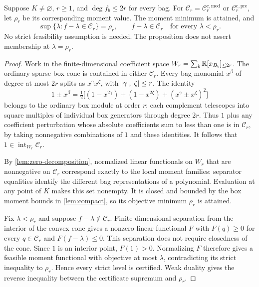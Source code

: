 \begin{proposition}\label{prop:constr-dual}
Suppose $K\ne\varnothing$, $r\ge1$, and $\deg f_b\le2r$ for every bag.
For $\mathcal C_r=\mathcal C_r^{\mathrm{c,mod}}$ or
$\mathcal C_r^{\mathrm{c,pre}}$, let $\rho_r$ be its corresponding moment
value. The moment minimum is attained, and
\[
 \sup\{\lambda:f-\lambda\in\mathcal C_r\}=\rho_r,
 \qquad f-\lambda\in\mathcal C_r\quad\text{for every }\lambda<\rho_r.
\]
No strict feasibility assumption is needed. The proposition does not assert
membership at $\lambda=\rho_r$.
\end{proposition}
\begin{proof}
Work in the finite-dimensional coefficient space
$W_r=\sum_b\mathbb{R}[x_{B_b}]_{\le 2r}$. The ordinary sparse box cone is contained
in either $\mathcal C_r$. Every bag monomial $x^\beta$ of degree at most
$2r$ splits as $x^\gamma x^\zeta$, with $\lvert \gamma\rvert,\lvert \zeta\rvert\le r$.
The identity
\[
 1\pm x^\beta=\tfrac12\bigl[(1-x^{2\gamma})+(1-x^{2\zeta})
                         +(x^\gamma\pm x^\zeta)^2\bigr]
\]
belongs to the ordinary box module at order $r$: each complement telescopes
into square multiples of individual box generators through degree $2r$.
Thus $1$ plus any coefficient perturbation whose absolute coefficients
sum to less than one is in $\mathcal C_r$, by taking nonnegative
combinations of $1$ and these identities. It follows that
$1\in\operatorname{int}_{W_r}\mathcal C_r$.

By \cref{lem:zero-decomposition}, normalized linear functionals on $W_r$
that are nonnegative on $\mathcal C_r$ correspond exactly to the local
moment families: separator equalities identify the different bag
representations of a polynomial. Evaluation at any point of $K$ makes this
set nonempty. It is closed and bounded by the box moment bounds in
\cref{lem:compact}, so its objective minimum $\rho_r$ is attained.

Fix $\lambda<\rho_r$ and suppose $f-\lambda\notin\mathcal C_r$.
Finite-dimensional separation from the interior of the convex cone gives
a nonzero linear functional $F$ with $F(q)\ge0$ for every
$q\in\mathcal C_r$ and $F(f-\lambda)\le0$. This separation does not require
closedness of the cone. Since $1$ is an interior point, $F(1)>0$.
Normalizing $F$ therefore gives a feasible moment functional with objective
at most $\lambda$, contradicting its strict inequality to $\rho_r$.
Hence every strict level is certified. Weak duality gives the reverse
inequality between the certificate supremum and $\rho_r$.
\end{proof}

